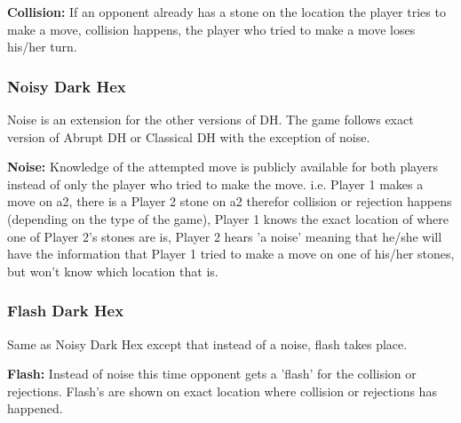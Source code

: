 {\bf Collision:} If an opponent already has a stone on the location the player tries to make a move, collision happens, the player who tried to make a move loses his/her turn.

\subsubsection{Noisy Dark Hex}

Noise is an extension for the other versions of DH. The game follows exact version of Abrupt DH or Classical DH with the exception of noise.

{\bf Noise:} Knowledge of the attempted move is publicly available for both players instead of only the player who tried to make the move. i.e. Player 1 makes a move on a2, there is a Player 2 stone on a2 therefor collision or rejection happens (depending on the type of the game), Player 1 knows the exact location of where one of Player 2's stones are is, Player 2 hears 'a noise' meaning that he/she will have the information that Player 1 tried to make a move on one of his/her stones, but won't know which location that is.

\subsubsection{Flash Dark Hex}

Same as Noisy Dark Hex except that instead of a noise, flash takes place.

{\bf Flash:} Instead of noise this time opponent gets a 'flash' for the collision or rejections. Flash's are shown on exact location where collision or rejections has happened.  
